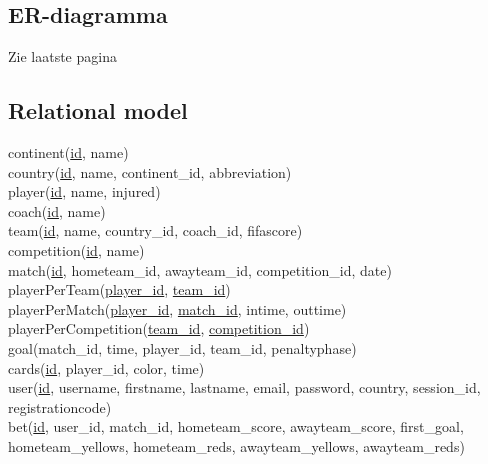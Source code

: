 \documentclass[11pt, a4paper]{article}
\begin{document}
\subsection{ER-diagramma}
Zie laatste pagina
\subsection{Relational model}
continent(\uline{id}, name) \\
country(\uline{id}, name, continent\_id, abbreviation) \\
player(\uline{id}, name, injured) \\
coach(\uline{id}, name) \\
team(\uline{id}, name, country\_id, coach\_id, fifascore) \\
competition(\uline{id}, name) \\
match(\uline{id}, hometeam\_id, awayteam\_id, competition\_id, date) \\
playerPerTeam(\uline{player\_id}, \uline{team\_id}) \\
playerPerMatch(\uline{player\_id}, \uline{match\_id}, intime, outtime) \\
playerPerCompetition(\uline{team\_id}, \uline{competition\_id}) \\
goal(match\_id, time, player\_id, team\_id, penaltyphase) \\
cards(\uline{id}, player\_id, color, time) \\
user(\uline{id}, username, firstname, lastname, email, password, country, session\_id, registrationcode) \\
bet(\uline{id}, user\_id, match\_id, hometeam\_score, awayteam\_score, first\_goal, hometeam\_yellows, hometeam\_reds, awayteam\_yellows, awayteam\_reds) \\
\end{document}
